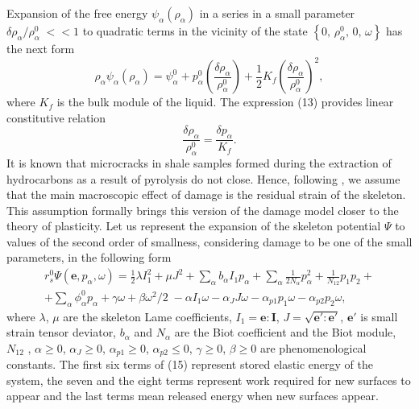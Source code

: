 \documentclass[article,authoryear,jpm]{beg_39}             %
\begin{document}
Expansion of the free energy
${{\psi }_{\alpha }}\left( {{\rho }_{\alpha }} \right)$
in a series in a small parameter
${\delta {{\rho }_{\alpha }}}/{\rho _{\alpha }^{0}}\;<<1$
to quadratic terms in the vicinity of the state
$\left\{ 0,\,\rho_{\alpha }^{0},\,0,\,\omega \right\}$
has the next form
\begin{equation}
{{\rho }_{\alpha }}{{\psi }_{\alpha }}\left( {{\rho }_{\alpha }} \right)=\psi _{\alpha }^{0}+p_{\alpha }^{0}\left( \frac{\delta {{\rho }_{\alpha }}}{\rho _{\alpha }^{0}} \right)+\frac{1}{2}{{K}_{f}}{{\left( \frac{\delta {{\rho }_{\alpha }}}{\rho _{\alpha }^{0}} \right)}^{2}},
\end{equation}
where ${{K}_{f}}$ is the bulk module of the liquid. The expression (13) provides linear constitutive relation
\begin{equation}
\frac{\delta {{\rho }_{\alpha }}}{\rho _{\alpha }^{0}}=\frac{\delta {{p}_{\alpha }}}{{{K}_{f}}}.
\end{equation}
It is known that microcracks in shale samples formed during the extraction of hydrocarbons as a result of pyrolysis do not close. Hence, following \cite{Kondaurov2002, Izvekov, Izvekov2020}, we assume that the main macroscopic effect of damage is the residual strain of the skeleton. This assumption formally brings this version of the damage model closer to the theory of plasticity. Let us represent the expansion of the skeleton potential $\Psi $ to values of the second order of smallness, considering damage to be one of the small parameters, in the following form
\begin{eqnarray}
r_{s}^{0} \Psi (\mathbf{e},{{p}_{\alpha }},\omega )=\frac{1}{2} \lambda I_{1}^{2}+\mu {{J}^{2}}+\sum\limits_{\alpha }{{{b}_{\alpha }}{{I}_{1}}{{p}_{\alpha}}} +\sum\limits_{\alpha }{\frac{1}{2{{N}_{\alpha }}}p_{\alpha }^{2}}+\frac{1}{{{N}_{12}}}{{p}_{1}}{{p}_{2}}+ \nonumber \\ +\sum \limits_{\alpha }{\phi _{\alpha }^{0}{{p}_{\alpha }}}+\gamma \omega +\beta {{{\omega }^{2}}}/{2}\;-\alpha {{I}_{1}}\omega -{{\alpha}_{J}}J \omega -{{\alpha }_{p1}}{{p}_{1}} \omega -{{\alpha }_{p2}}{{p}_{2}} \omega,
\end{eqnarray}
where $\lambda$, $\mu$ are the skeleton Lame coefficients, ${{I}_{1}}=\mathbf{e}:\mathbf{I}$, $J=\sqrt{\mathbf{{e}'}:\mathbf{{e}'}}$, $\mathbf{{e}'}$ is small strain tensor deviator, ${{b}_{\alpha }}$ and ${{N}_{\alpha }}$ are the Biot coefficient and the Biot module, ${{N}_{12}}$ , $\alpha \ge 0$, ${{\alpha }_{J}}\ge 0$, ${{\alpha }_{p1}}\ge 0$, ${{\alpha }_{p2}}\le 0$, $\gamma \ge 0$, $\beta \ge 0$ are phenomenological constants. The first six terms of (15) represent stored elastic energy of the system, the seven and the eight terms represent work required for new surfaces to appear and the last terms mean released energy when new surfaces appear.
\end{document}
